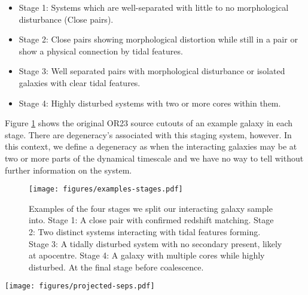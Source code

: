 \documentclass[fleqn,usenatbib]{mnras}
\begin{document}
\begin{itemize}
    \item Stage 1: Systems which are well-separated with little to no morphological disturbance (Close pairs).
    \item Stage 2: Close pairs showing morphological distortion while still in a pair or show a physical connection by tidal features.
    \item Stage 3: Well separated pairs with morphological disturbance or isolated galaxies with clear tidal features.
    \item Stage 4: Highly disturbed systems with two or more cores within them.
\end{itemize}

\noindent Figure \ref{fig:stages} shows the original OR23 source cutouts of an example galaxy in each stage. There are degeneracy's associated with this staging system, however. In this context, we define a degeneracy as when the interacting galaxies may be at two or more parts of the dynamical timescale and we have no way to tell without further information on the system.

\begin{figure}
    \centering
    \texttt{[image: figures/examples-stages.pdf]}
    \caption{Examples of the four stages we split our interacting galaxy sample into. Stage 1: A close pair with confirmed redshift matching. Stage 2: Two distinct systems interacting with tidal features forming. Stage 3: A tidally disturbed system with no secondary present, likely at apocentre. Stage 4: A galaxy with multiple cores while highly disturbed. At the final stage before coalescence.}
    \label{fig:stages}
\end{figure}

\begin{figure*}
    \centering
    \texttt{[image: figures/projected-seps.pdf]}
    \caption{The projected separations of the confirmed galaxy pairs in our sample. This confers with other works the definition of our different stages. Stage 1 can be at any projected separation, however, we have visually confirmed that these sources are not morphologically disturbed. Stage 2 is dominated by systems with small projected separation as, by definition, they must be morphologically linked or overlapping. Those systems at larger separation are very large systems whose morphology categorise them as stage 2. Finally, stage 3 galaxies are those which are visually confirmed to be fully morphologically separated and tidally disturbed. The bulk of these lie in a range of 25 - 100kpc in projected separation from each other. There is some overlap between stage 2 and stage 3 in projected separation, as their visual classification is also dependent on the system size.}
    \label{fig:proj-seps}
\end{figure*}
\end{document}
